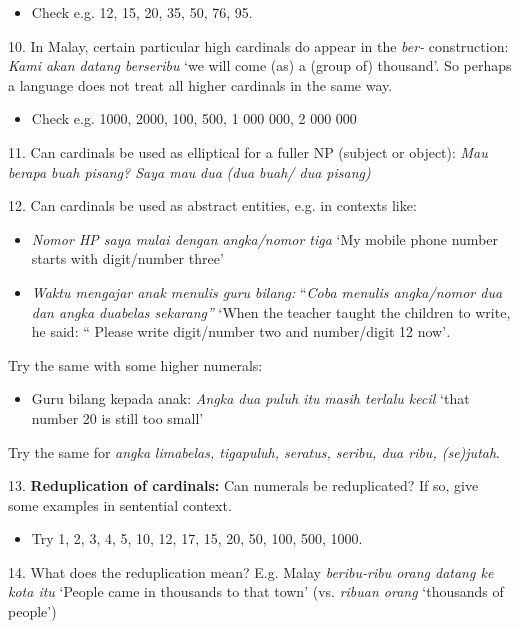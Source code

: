 \begin{itemize}
\item Check e.g. 12, 15, 20, 35, 50, 76, 95. 
\end{itemize}
10. In Malay, certain particular high cardinals do appear in the \textit{ber-} construction: \textit{Kami akan datang berseribu }{\textquoteleft}we will come (as) a (group of) thousand{\textquoteright}. So perhaps a language does not treat all higher cardinals in the same way. 

\begin{itemize}
\item Check e.g. 1000, 2000, 100, 500, 1 000 000, 2 000 000
\end{itemize}
11. Can cardinals be used as elliptical for a fuller NP (subject or object): \textit{Mau berapa buah pisang? Saya mau }\textit{dua}\textit{ (dua buah/ dua pisang)}

12. Can cardinals be used as abstract entities, e.g. in contexts like: 

\begin{itemize}
\item \textit{Nomor HP saya mulai dengan angka/nomor tiga }{\textquoteleft}My mobile phone number starts with digit/number three{\textquoteright} 
\item \textit{Waktu mengajar anak menulis guru bilang:} {\textquotedblleft}\textit{Coba menulis angka/nomor dua dan angka duabelas sekarang{\textquotedblright} } {\textquoteleft}When the teacher taught the children to write, he said: {\textquotedblleft} Please write digit/number two and number/digit 12 now{\textquoteright}\textit{. }
\end{itemize}
Try the same with some higher numerals: 

\begin{itemize}
\item Guru bilang kepada anak: \textit{Angka dua puluh itu}\textit{ masih terlalu kecil  }{\textquoteleft}that number 20 is still too small{\textquoteright} 
\end{itemize}
Try the same for \textit{angka} \textit{limabelas, tigapuluh, seratus, seribu, dua ribu, (se)jutah}.

13. \textbf{Reduplication of cardinals:} Can numerals be reduplicated? If so, give some examples in sentential context. 

\begin{itemize}
\item Try 1, 2, 3, 4, 5, 10, 12, 17, 15, 20, 50, 100, 500, 1000.
\end{itemize}
14. What does the reduplication mean? E.g. Malay \textit{beribu-ribu orang datang ke kota itu }{\textquoteleft}People came in thousands to that town{\textquoteright} (vs. \textit{ribuan orang }{\textquoteleft}thousands of people{\textquoteright}) 

